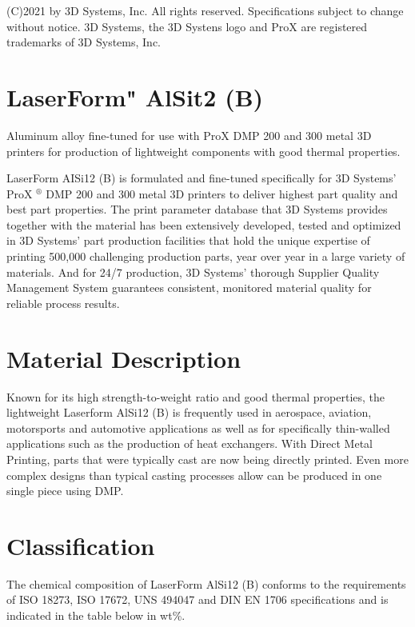 \documentclass[10pt]{article}
\begin{document}
(C)2021 by 3D Systems, Inc. All rights reserved. Specifications subject to change without notice. 3D Systems, the 3D Systens logo and ProX are registered trademarks of 3D Systems, Inc.

\section*{LaserForm" AlSit2 (B)}
Aluminum alloy fine-tuned for use with ProX DMP 200 and 300 metal 3D printers for production of lightweight components with good thermal properties.

LaserForm AISi12 (B) is formulated and fine-tuned specifically for 3D Systems' ProX ${ }^{\circledR}$ DMP 200 and 300 metal 3D printers to deliver highest part quality and best part properties. The print parameter database that 3D Systems provides together with the material has been extensively developed, tested and optimized in 3D Systems' part production facilities that hold the unique expertise of printing 500,000 challenging production parts, year over year in a large variety of materials. And for 24/7 production, 3D Systems' thorough Supplier Quality Management System guarantees consistent, monitored material quality for reliable process results.

\section*{Material Description}
Known for its high strength-to-weight ratio and good thermal properties, the lightweight Laserform AlSi12 (B) is frequently used in aerospace, aviation, motorsports and automotive applications as well as for specifically thin-walled applications such as the production of heat exchangers. With Direct Metal Printing, parts that were typically cast are now being directly printed. Even more complex designs than typical casting processes allow can be produced in one single piece using DMP.

\section*{Classification}
The chemical composition of LaserForm AlSi12 (B) conforms to the requirements of ISO 18273, ISO 17672, UNS 494047 and DIN EN 1706 specifications and is indicated in the table below in wt\%.
\end{document}
